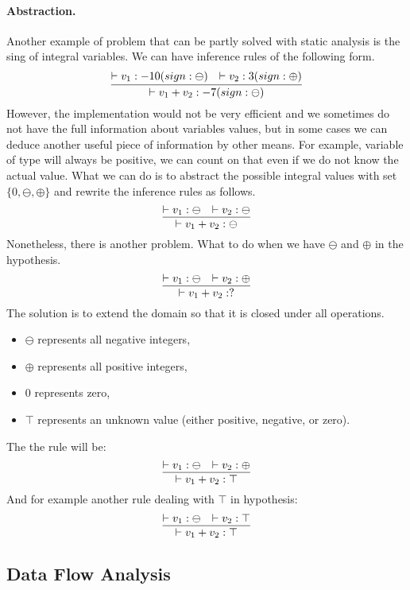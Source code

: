         \paragraph{Abstraction.}
        Another example of problem that can be partly solved with static analysis 
        is the sing of integral variables. We can have inference rules of the 
        following form.
        $$
        \infer{\vdash v_1+v_2 : -7 (sign: \ominus)}
        {\vdash v_1 : -10 (sign: \ominus) & \vdash v_2 : 3 (sign: \oplus)}
        $$
        However, the implementation would not be very efficient and we sometimes 
        do not have the full information about variables values, but in some cases 
        we can deduce another useful piece of information by other means. For example, variable of 
        type  will always be positive, we can count on that 
        even if we do not know the actual value. What we 
        can do is to abstract the possible integral values with set 
        $\{0, \ominus, \oplus\}$ and rewrite the inference rules as follows.
        $$
        \infer{\vdash v_1+v_2 : \ominus}
        {\vdash v_1 : \ominus & \vdash v_2 : \ominus}
        $$
        Nonetheless, there is another problem. What to do when we have $\ominus$ 
        and $\oplus$ in the hypothesis.
        $$
        \infer{\vdash v_1+v_2 : ?}
        {\vdash v_1 : \ominus & \vdash v_2 : \oplus}
        $$
        The solution is to extend the domain so that it is closed under all operations.
        \begin{itemize}
            \item $\ominus$ represents all negative integers,
            \item $\oplus$ represents all positive integers,
            \item $0$ represents zero,
            \item $\top$ represents an unknown value (either positive, negative, or zero).
        \end{itemize}
        The the rule will be:
        $$
        \infer{\vdash v_1+v_2 : \top}
        {\vdash v_1 : \ominus & \vdash v_2 : \oplus}
        $$
        And for example another rule dealing with $\top$ in hypothesis:
        $$
        \infer{\vdash v_1+v_2 : \top}
        {\vdash v_1 : \ominus & \vdash v_2 : \top}
        $$               
    
        \subsection{Data Flow Analysis}

